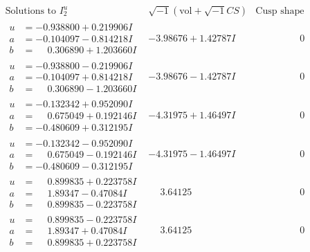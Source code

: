 \documentclass[1p]{elsarticle_modified}
\theoremstyle{definition}
\newcommand{\I}{\sqrt{-1}}
\begin{document}
$$\begin{array}{c|c|c}  
\text{Solutions to }I^u_{2}& \I (\text{vol} + \sqrt{-1}CS) & \text{Cusp shape}\\
 \hline 
\begin{aligned}
u &= -0.938800 + 0.219906 I \\
a &= -0.104097 - 0.814218 I \\
b &= \phantom{-}0.306890 + 1.203660 I\end{aligned}
 & -3.98676 + 1.42787 I & \phantom{-0.000000 } 0 \\ \hline\begin{aligned}
u &= -0.938800 - 0.219906 I \\
a &= -0.104097 + 0.814218 I \\
b &= \phantom{-}0.306890 - 1.203660 I\end{aligned}
 & -3.98676 - 1.42787 I & \phantom{-0.000000 } 0 \\ \hline\begin{aligned}
u &= -0.132342 + 0.952090 I \\
a &= \phantom{-}0.675049 + 0.192146 I \\
b &= -0.480609 + 0.312195 I\end{aligned}
 & -4.31975 + 1.46497 I & \phantom{-0.000000 } 0 \\ \hline\begin{aligned}
u &= -0.132342 - 0.952090 I \\
a &= \phantom{-}0.675049 - 0.192146 I \\
b &= -0.480609 - 0.312195 I\end{aligned}
 & -4.31975 - 1.46497 I & \phantom{-0.000000 } 0 \\ \hline\begin{aligned}
u &= \phantom{-}0.899835 + 0.223758 I \\
a &= \phantom{-}1.89347 - 0.47084 I \\
b &= \phantom{-}0.899835 - 0.223758 I\end{aligned}
 & \phantom{-}3.64125\phantom{ +0.000000I} & \phantom{-0.000000 } 0 \\ \hline\begin{aligned}
u &= \phantom{-}0.899835 - 0.223758 I \\
a &= \phantom{-}1.89347 + 0.47084 I \\
b &= \phantom{-}0.899835 + 0.223758 I\end{aligned}
 & \phantom{-}3.64125\phantom{ +0.000000I} & \phantom{-0.000000 } 0 \\ \hline\begin{aligned}

\end{aligned}
\end{array}$$
\end{document}
